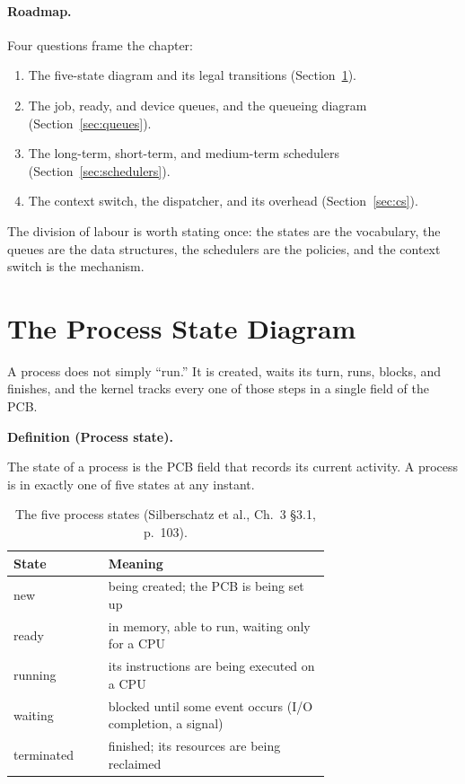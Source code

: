 \documentclass[11pt]{article}
\newenvironment{definitionbox}[1]{%
  \par\noindent\textbf{Definition (#1).}\ \itshape
}{\par\vspace{0.3em}}
\begin{document}
\paragraph{Roadmap.} Four questions frame the chapter:
\begin{enumerate}
  \item {} The five-state diagram and its
        legal transitions (Section~\ref{sec:states}).
  \item {} The job, ready, and device
        queues, and the queueing diagram (Section~\ref{sec:queues}).
  \item {} The long-term, short-term,
        and medium-term schedulers (Section~\ref{sec:schedulers}).
  \item {} The context switch, the dispatcher, and
        its overhead (Section~\ref{sec:cs}).
\end{enumerate}
The division of labour is worth stating once: the states are the vocabulary,
the queues are the data structures, the schedulers are the policies, and the
context switch is the mechanism.

\section{The Process State Diagram}
\label{sec:states}

\noindent{}

A process does not simply ``run.'' It is created, waits its turn, runs, blocks,
and finishes, and the kernel tracks every one of those steps in a single field
of the PCB.

\begin{definitionbox}{Process state}
The state of a process is the PCB field that records its current activity. A
process is in exactly one of five states at any instant.
\end{definitionbox}

\begin{table}[h]
\centering
\small
\renewcommand{\arraystretch}{1.25}
\begin{tabular}{@{}>{\ttfamily}l>{\raggedright\arraybackslash}p{0.7\linewidth}@{}}
\toprule
\normalfont\textbf{State} & \textbf{Meaning} \\
\midrule
new & being created; the PCB is being set up \\
ready & in memory, able to run, waiting only for a CPU \\
running & its instructions are being executed on a CPU \\
waiting & blocked until some event occurs (I/O completion, a signal) \\
terminated & finished; its resources are being reclaimed \\
\bottomrule
\end{tabular}
\caption{The five process states (Silberschatz et al., Ch.~3 \S3.1, p.~103).}
\label{tab:states}
\end{table}
\end{document}
